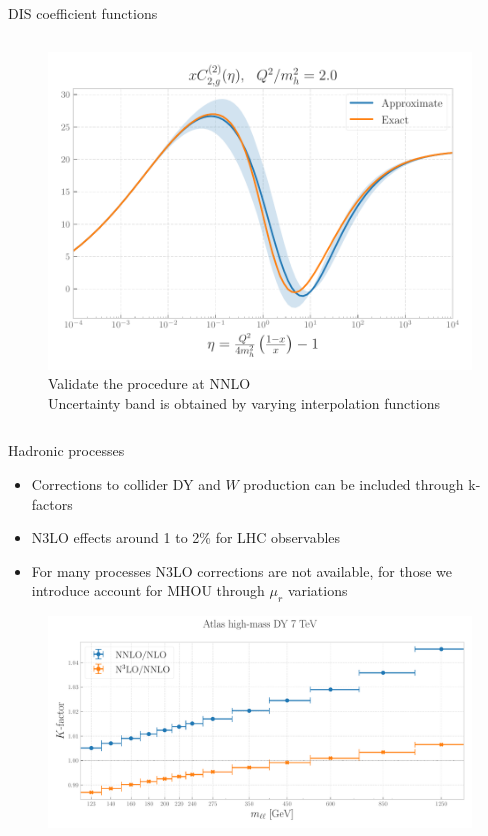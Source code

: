 \documentclass[8pt,t]{beamer}
\begin{document}
\begin{frame}{DIS coefficient functions}
\begin{columns}
\begin{column}{0.49\textwidth}
      \vspace*{2.5em}
      \begin{figure}
        \centering
        \includegraphics[width=.9\textwidth]{figures/C2g_2_Q2m2_2.0.pdf}
        \caption*{
          Validate the procedure at NNLO \\
          Uncertainty band is obtained by varying interpolation functions
        }
      \end{figure}
    \end{column}
  \end{columns}
\end{frame}


\begin{frame}{Hadronic processes}
  \begin{itemize}
    \item Corrections to collider DY and $W$ production can be included through k-factors
    \item N3LO effects around 1 to 2\% for LHC observables
    \item For many processes N3LO corrections are not available, for those we introduce account for MHOU through $\mu_r$ variations
  \end{itemize}
  \begin{figure}[!t]
    \centering
    \includegraphics[width=.80\textwidth]{figures/kfactor_ATLASZHIGHMASS49FB.pdf}
  \end{figure}
\end{frame}
\end{document}
